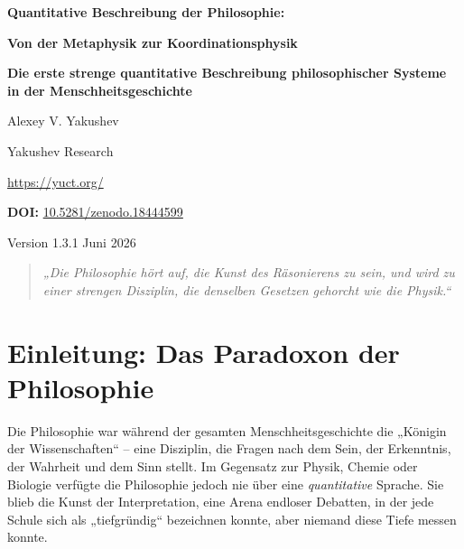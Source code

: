 \documentclass[12pt,a4paper]{article}
\begin{document}
	
	\begin{titlepage}
		\begin{center}
			\vspace*{1cm}
			{\Huge\bfseries\color{darkblue} Quantitative Beschreibung der Philosophie: \par}
			\vspace{0.3cm}
			{\Huge\bfseries\color{darkblue} Von der Metaphysik zur Koordinationsphysik\par}
			\vspace{1cm}
			{\Large\bfseries Die erste strenge quantitative Beschreibung philosophischer Systeme in der Menschheitsgeschichte\par}
			\vspace{1.5cm}
			{\large Alexey V. Yakushev\par}
			{\large Yakushev Research\par}
			{\large \url{https://yuct.org/}\par}
			\vspace{1cm}
			{\large \textbf{DOI:} \href{https://doi.org/10.5281/zenodo.18444599}{10.5281/zenodo.18444599}\par}
			\vspace{1cm}
			{\large Version 1.3.1 \quad Juni 2026\par}
			\vfill
			\begin{quote}
				\itshape
				„Die Philosophie hört auf, die Kunst des Räsonierens zu sein, und wird zu einer strengen Disziplin, die denselben Gesetzen gehorcht wie die Physik.“
			\end{quote}
		\end{center}
	\end{titlepage}
	
	\tableofcontents
	\newpage
	
	\section{Einleitung: Das Paradoxon der Philosophie}
	
	Die Philosophie war während der gesamten Menschheitsgeschichte die „Königin der Wissenschaften“ – eine Disziplin, die Fragen nach dem Sein, der Erkenntnis, der Wahrheit und dem Sinn stellt. Im Gegensatz zur Physik, Chemie oder Biologie verfügte die Philosophie jedoch nie über eine \emph{quantitative} Sprache. Sie blieb die Kunst der Interpretation, eine Arena endloser Debatten, in der jede Schule sich als „tiefgründig“ bezeichnen konnte, aber niemand diese Tiefe messen konnte.
	
\end{document}
